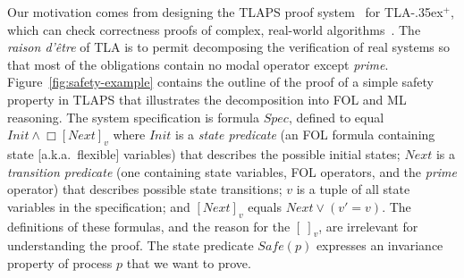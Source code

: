 \documentclass[a4paper,fleqn,envcountsame,orivec]{llncs}
\newcommand{\implies}{\Rightarrow}
\newcommand{\tlaplus}{\mbox{TLA\kern -.35ex$^+$}\xspace}
\newcommand{\edmargin}[2]{\marginpar{\raggedright\footnotesize\color{red}#1: #2}}
\newcommand{\edmargin}[2]{}
\def\llmargin{\edmargin{LL}}
\def\smmargin{\edmargin{SM}}
\begin{document}
Our motivation comes from designing the TLAPS proof
system~\cite{cousineau:tlaps} for \tlaplus, which can check
correctness proofs of complex, real-world algorithms~\cite{lamport:byzantizing}.
The \emph{raison d'\^{e}tre} of
TLA is to permit decomposing the verification of real systems so that
most of the obligations
contain no modal operator except \emph{prime}. Figure~\ref{fig:safety-example}
contains the outline of the proof of a simple safety property in TLAPS that
illustrates the decomposition into FOL and ML reasoning. The system
specification is formula $Spec$, defined to equal
  $Init \land \Box[Next]_v$
where $Init$ is a \emph{state predicate} (an FOL formula containing
state [a.k.a.\ flexible] variables) that describes the possible initial
states; $Next$ is a \emph{transition predicate} (one containing state
variables, FOL operators, and the \emph{prime} operator) that
describes possible state transitions; $v$ is a tuple of all state
variables in the specification; and $[Next]_v$ equals
  $Next \lor (v'=v)$.
%
%
The definitions of these formulas, and the reason for the
 $[\ ]_{v}$,
are irrelevant for understanding the proof.
%
%
The state predicate $Safe(p)$ expresses an invariance property of
process $p$ that we want to prove.

\end{document}
